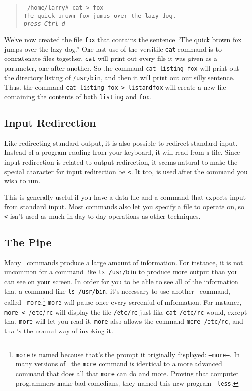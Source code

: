 \begin{quote}{\tt 
/home/larry\# cat > fox\\
The quick brown fox jumps over the lazy dog.\\
{\em press Ctrl-d}
}\end{quote}

We've now created the file {\tt fox} that contains the sentence ``The
quick brown fox jumps over the lazy dog.'' One last use of the
versitile {\tt cat} command is to con{\bf cat}enate files together.
{\tt cat} will print out every file it was given as a parameter, one
after another. So the command {\tt cat listing fox} will print out the
directory listing of {\tt /usr/bin}, and then it will print out our
silly sentence. Thus, the command {\tt cat listing fox > listandfox}
will create a new file containing the contents of both {\tt listing}
and {\tt fox}.


\subsection{Input Redirection}

Like redirecting standard output, it is also
possible to redirect standard input. Instead of
a program reading from your keyboard, it will read from a file.  Since
input redirection is related to output redirection, it seems natural
to make the special character for input redirection be {\tt <}. It
too, is used after the command you wish to run.

This is generally useful if you have a data file and a command that
expects input from standard input.  Most commands also let you specify
a file to operate on, so {\tt <} isn't used as much in day-to-day
operations as other techniques.


\subsection{The Pipe}

Many \unix\ commands produce a large amount of information. For instance,
it is not uncommon for a command like {\tt ls /usr/bin} to produce more
output than you can see on your screen. In order for you to be able to see
all of the information that a command like {\tt ls /usr/bin}, it's
necessary to use another \unix\ command, called {\tt
more}.\footnote{{\tt more} is named because
that's the prompt it originally displayed: {\tt --more--}. In many versions
of \linux\ the {\tt more} command is identical to a more advanced command
that does all that {\tt more} can do and more. Proving that computer
programmers make bad comedians, they named this new program {\tt
less}.} {\tt more} will pause once every screenful
of information. For instance, {\tt more < /etc/rc} will display the file
{\tt /etc/rc} just like {\tt cat /etc/rc} would, except that {\tt more}
will let you read it.  {\tt more} also allows the command {\tt more
/etc/rc}, and that's the normal way of invoking it.

